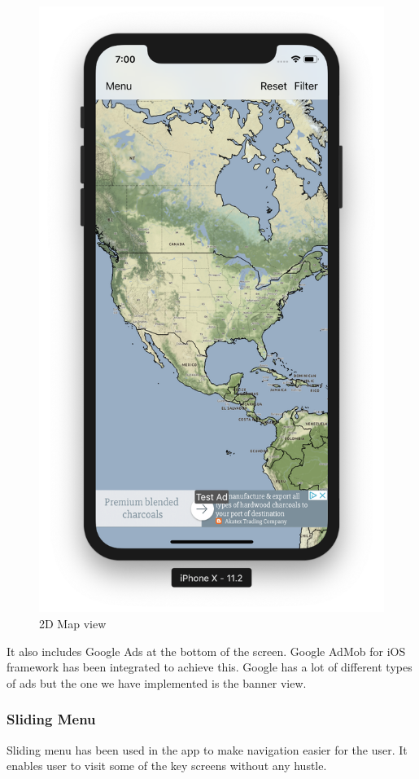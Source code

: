 \begin{figure}[!htb]
\begin{minipage}{0.5\textwidth}
            \includegraphics[width=0.8\linewidth]{figures/ch4/home.png}
            \caption{2D Map view}\label{Fig:home_map}
        \end{minipage}
    \end{figure}
    
    It also includes Google Ads at the bottom of the screen. Google AdMob for \gls{iOS} framework has been integrated to achieve this. Google has a lot of different types of ads but the one we have implemented is the banner view.

\newpage

\subsubsection{Sliding Menu}

Sliding menu has been used in the app to make navigation easier for the user. It enables user to visit some of the key screens without any hustle.

